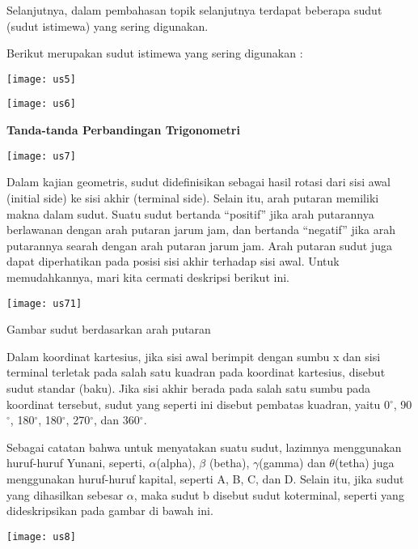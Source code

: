\documentclass[11pt,fleqn]{book} %
\begin{document}
\noindent 

\noindent 

Selanjutnya, dalam pembahasan topik selanjutnya terdapat beberapa sudut (sudut istimewa) yang sering digunakan.

Berikut merupakan sudut istimewa yang sering digunakan :

\texttt{[image: us5]}

\texttt{[image: us6]}



\textbf{}

\textbf{Tanda-tanda Perbandingan Trigonometri }

\texttt{[image: us7]}

Dalam kajian geometris, sudut didefinisikan sebagai hasil rotasi dari sisi awal (initial side) ke sisi akhir (terminal side).  Selain itu, arah putaran memiliki makna dalam sudut. Suatu sudut bertanda ``positif'' jika arah putarannya berlawanan dengan arah putaran jarum jam, dan bertanda ``negatif'' jika arah putarannya searah dengan arah putaran jarum jam. Arah putaran sudut juga dapat diperhatikan pada posisi sisi akhir terhadap sisi awal. Untuk memudahkannya, mari kita cermati deskripsi berikut ini.

\texttt{[image: us71]}

\noindent 

Gambar sudut berdasarkan arah putaran

Dalam koordinat kartesius, jika sisi awal berimpit dengan sumbu x dan sisi terminal terletak pada salah satu kuadran pada koordinat kartesius, disebut sudut standar (baku).  Jika sisi akhir berada pada salah satu sumbu pada koordinat tersebut, sudut yang seperti ini disebut pembatas kuadran, yaitu 0${}^\circ $, 90${}^\circ $, 180${}^\circ $, 180${}^\circ $, 270${}^\circ $, dan 360${}^\circ $.

Sebagai catatan bahwa untuk menyatakan suatu sudut, lazimnya menggunakan huruf-huruf Yunani, seperti, $\alpha$(alpha), $\beta $ (betha), $\gamma$(gamma) dan $\theta$(tetha) juga menggunakan huruf-huruf kapital, seperti A, B, C, dan D.  Selain itu, jika sudut  yang dihasilkan sebesar $\alpha$, maka sudut b disebut sudut koterminal, seperti yang dideskripsikan pada gambar di bawah ini.

\noindent \texttt{[image: us8]}
\end{document}
